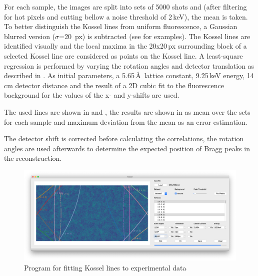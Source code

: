 For each sample, the images are split into sets of 5000 shots and (after filtering for hot pixels and cutting bellow a noise threshold of 2\,keV), the mean is taken. To better distinguish the Kossel lines from uniform fluorescence, a Gaussian blurred version ($\sigma$=20\, px) is subtracted (see  for examples). The Kossel lines are identified visually and the local maxima in the 20x20\,px surrounding block of a selected Kossel line are considered as points on the Kossel line. A least-square regression is performed by varying the rotation angles and detector translation as described in . 
As initial parameters, a 5.65\,\AA\, lattice constant, 9.25\,keV energy, 14\,cm detector distance and the result of a 2D cubic fit to the fluorescence background for the values of the x- and y-shifts are used. 

The used lines are shown in  and , the results are shown in  as mean over the sets for each sample and maximum deviation from the mean as an error estimation.

The detector shift is corrected before calculating the correlations, the rotation angles are used afterwards to determine the expected position of Bragg peaks in the reconstruction.
\begin{figure}
	\centering
	\includegraphics[width=0.8\linewidth]{images/kosselfit.png}
	\caption{Program for fitting Kossel lines to experimental data}
	\label{fig:kosselfit}
\end{figure}




